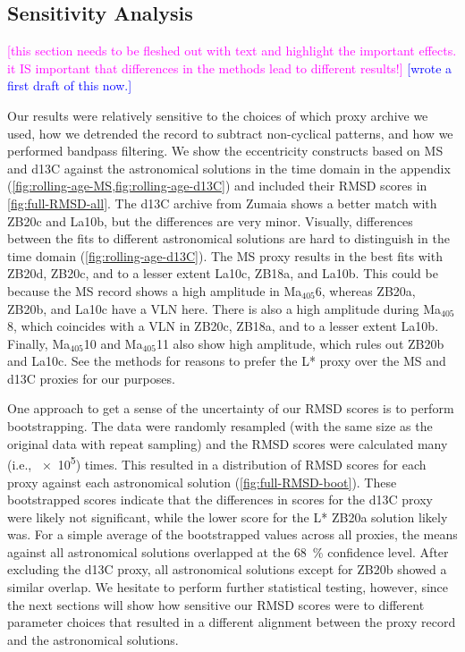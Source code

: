 \documentclass[draft]{agujournal2019}
\newcommand{\ma}[1]{Ma\(_{405}\)#1} %
\newcommand{\rez}{\textcolor{magenta}}
\newcommand{\ijk}{\textcolor{blue}}
\begin{document}
\subsection{Sensitivity Analysis}
\rez{[this section needs to be fleshed out with text and highlight the important effects. it IS important that differences in the methods lead to different results!]}
\ijk{[wrote a first draft of this now.]}

Our results were relatively sensitive to the choices of which proxy archive we used, how we detrended the record to subtract non-cyclical patterns, and how we performed bandpass filtering.
We show the eccentricity constructs based on \gls{MS} and \gls{d13C} against the astronomical solutions in the time domain in the appendix (\cref{fig:rolling-age-MS,fig:rolling-age-d13C}) and included their \gls{RMSD} scores in \cref{fig:full-RMSD-all}.
The \gls{d13C} archive from Zumaia shows a better match with ZB20c and La10b, but the differences are very minor.
Visually, differences between the fits to different astronomical solutions are hard to distinguish in the time domain (\cref{fig:rolling-age-d13C}).
The \gls{MS} proxy results in the best fits with ZB20d, ZB20c, and to a lesser extent La10c, ZB18a, and La10b.
This could be because the \gls{MS} record shows a high amplitude in \ma{6}, whereas ZB20a, ZB20b, and La10c have a \gls{VLN} here.
There is also a high amplitude during \ma{8}, which coincides with a \gls{VLN} in ZB20c, ZB18a, and to a lesser extent La10b.
Finally, \ma{10} and \ma{11} also show high amplitude, which rules out ZB20b and La10c.
See the methods for reasons to prefer the \gls{L*} proxy over the \gls{MS} and \gls{d13C} proxies for our purposes.

One approach to get a sense of the uncertainty of our \gls{RMSD} scores is to perform bootstrapping.
The data were randomly resampled (with the same size as the original data with repeat sampling) and the \gls{RMSD} scores were calculated many (i.e., \num{e5}) times.
This resulted in a distribution of \gls{RMSD} scores for each proxy against each astronomical solution (\cref{fig:full-RMSD-boot}).
These bootstrapped scores indicate that the differences in scores for the \gls{d13C} proxy were likely not significant, while the lower score for the \gls{L*} ZB20a solution likely was.
For a simple average of the bootstrapped values across all proxies, the means against all astronomical solutions overlapped at the \qty{68}{\percent} confidence level.
After excluding the \gls{d13C} proxy, all astronomical solutions except for ZB20b showed a similar overlap.
We hesitate to perform further statistical testing, however, since the next sections will show how sensitive our \gls{RMSD} scores were to different parameter choices that resulted in a different alignment between the proxy record and the astronomical solutions.
\end{document}
